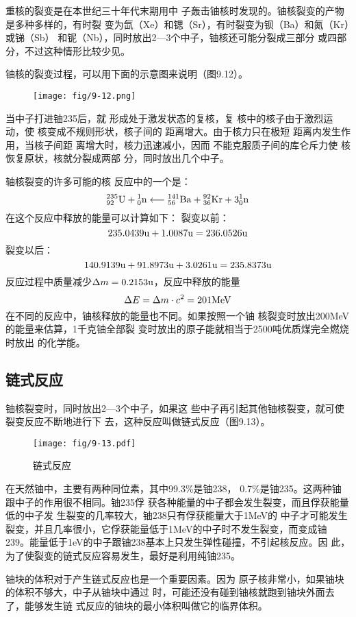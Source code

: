 重核的裂变是在本世纪三十年代末期用中
子轰击铀核时发现的。铀核裂变的产物是多种多样的，有时裂
变为氙（Xe）和锶（Sr），有时裂变为钡（Ba）和氮（Kr）或锑（Sb）
和铌（Nb），同时放出2—3个中子，铀核还可能分裂成三部分
或四部分，不过这种情形比较少见。

铀核的裂变过程，可以用下面的示意图来说明（图9.12）。
\begin{figure}[htp]\centering
\texttt{[image: fig/9-12.png]}
\caption{}
\end{figure}

当中子打进铀235后，就
形成处于激发状态的复核，复
核中的核子由于激烈运动，使
核变成不规则形状，核子间的
距离增大。由于核力只在极短
距离内发生作用，当核子间距
离增大时，核力迅速减小，因而
不能克服质子间的库仑斥力使
核恢复原状，核就分裂成两部
分，同时放出几个中子。

轴核裂变的许多可能的核
反应中的一个是：
\[\atom{U}{235}{92}+\atom{n}{1}{0}\longleftarrow \atom{Ba}{141}{56}+\atom{Kr}{92}{36}+3\atom{n}{1}{0}\]
在这个反应中释放的能量可以计算如下：
裂变以前：
\[235.0439{\rm u}+1.0087{\rm u}=236.0526{\rm u} \]
裂变以后：
\[140.9139{\rm u}+91.8973{\rm u}+3.0261{\rm u}=235.8373{\rm u} \]
反应过程中质量减少$\Delta m=0.2153{\rm u}$，反应中释放的能量
\[\Delta E=\Delta m\cdot c^2=201{\rm MeV}\]
在不同的反应中，铀核释放的能量也不同。如果按照一个铀
核裂变时放出200MeV的能量来估算，1千克铀全部裂
变时放出的原子能就相当于2500吨优质煤完全燃烧时放出
的化学能。

\subsection{链式反应} 

铀核裂变时，同时放出2—3个中子，如果这
些中子再引起其他铀核裂变，就可使裂变反应不断地进行下
去，这种反应叫做链式反应（图9.13）。

\begin{figure}[htp]
    \centering
    \texttt{[image: fig/9-13.pdf]}
    \caption{链式反应}
\end{figure}


在天然铀中，主要有两种同位素，其中99.3\%是铀238，
0.7\%是铀235。这两种铀跟中子的作用很不相同。铀235俘
获各种能量的中子都会发生裂变，而且俘获能量低的中子发
生裂变的几率较大，铀238只有俘获能量大于1MeV的
中子才可能发生裂变，并且几率很小，它俘获能量低于1MeV的中子时不发生裂变，而变成铀239。能量低于1eV的中子跟铀238基本上只发生弹性碰撞，不引起核反应。因
此，为了使裂变的链式反应容易发生，最好是利用纯铀235。

铀块的体积对于产生链式反应也是一个重要因素。因为
原子核非常小，如果铀块的体积不够大，中子从铀块中通过
时，可能还没有碰到铀核就跑到铀块外面去了，能够发生链
式反应的铀块的最小体积叫做它的临界体积。

